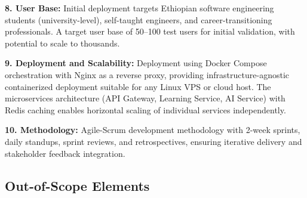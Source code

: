 \textbf{8. User Base:} Initial deployment targets Ethiopian software engineering students (university-level), self-taught engineers, and career-transitioning professionals. A target user base of 50--100 test users for initial validation, with potential to scale to thousands.

\textbf{9. Deployment and Scalability:} Deployment using Docker Compose orchestration with Nginx as a reverse proxy, providing infrastructure-agnostic containerized deployment suitable for any Linux VPS or cloud host. The microservices architecture (API Gateway, Learning Service, AI Service) with Redis caching enables horizontal scaling of individual services independently.

\textbf{10. Methodology:} Agile-Scrum development methodology with 2-week sprints, daily standups, sprint reviews, and retrospectives, ensuring iterative delivery and stakeholder feedback integration.

\subsection{Out-of-Scope Elements}

